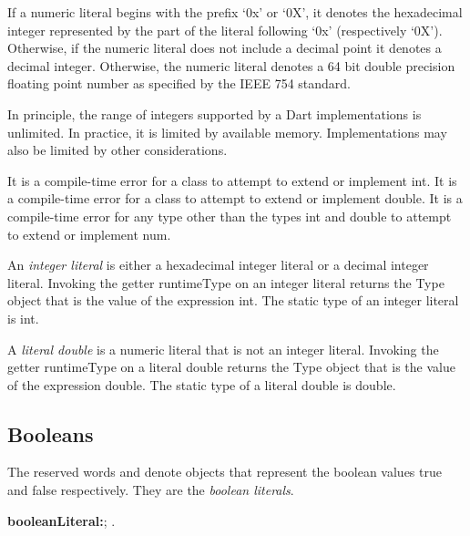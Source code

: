 \documentclass{article}
\newcommand{\code}[1]{{\sf #1}}
\begin{document}
\LMHash{}
If a numeric literal begins with the prefix `0x' or `0X', it denotes the hexadecimal integer represented by the part of the literal following `0x' (respectively `0X'). Otherwise, if the numeric literal does not include a decimal point  it denotes a decimal integer.  Otherwise, the numeric literal  denotes a 64 bit double precision floating point number as specified by the IEEE 754 standard. 

\LMHash{}
In principle, the range of integers supported by a Dart implementations is unlimited. In practice, it is limited by available memory. Implementations may also be limited by other considerations.


\LMHash{}
It is a compile-time error for a class to attempt to extend or implement \code{int}. It is a compile-time error for a class to attempt to extend or implement \code{double}. It is a compile-time error for any type other than the types \code{int} and \code{double} to attempt to extend or implement \code{num}.

\LMHash{}
An {\em integer literal} is either a hexadecimal integer literal or a  decimal integer literal. Invoking the getter \code{runtimeType} on an integer literal returns the \code{Type} object that is the value of the expression \code{int}. The static type of an integer literal is \code{int}. 

\LMHash{}
A {\em literal double} is a numeric literal that is not an integer literal. Invoking the getter \code{runtimeType} on a literal double returns the \code{Type} object that is the value of the expression \code{double}.
The static type of a literal double is \code{double}.
    
\subsection{Booleans}

\LMHash{}
The reserved words \TRUE{} and \FALSE{} denote objects that represent the boolean values true and false respectively. They are the {\em boolean literals}.

\begin{grammar}
{\bf booleanLiteral:}\TRUE{};
        \FALSE{}
    .
\end{grammar}
\end{document}
